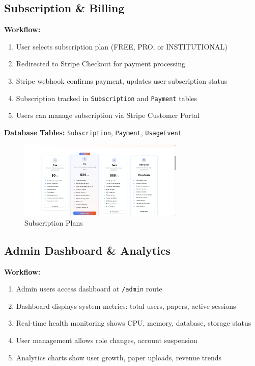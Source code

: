 \subsection{Subscription \& Billing}

\textbf{Workflow:}
\begin{enumerate}[leftmargin=*,topsep=3pt,itemsep=2pt]
    \item User selects subscription plan (FREE, PRO, or INSTITUTIONAL)
    \item Redirected to Stripe Checkout for payment processing
    \item Stripe webhook confirms payment, updates user subscription status
    \item Subscription tracked in \texttt{Subscription} and \texttt{Payment} tables
    \item Users can manage subscription via Stripe Customer Portal
\end{enumerate}

\textbf{Database Tables:} \texttt{Subscription}, \texttt{Payment}, \texttt{UsageEvent}

\begin{figure}[H]
\centering
\includegraphics[width=0.7\textwidth]{images/screenshots/billing_plan.png}
\caption{Subscription Plans}
\label{fig:billing}
\end{figure}

\subsection{Admin Dashboard \& Analytics}

\textbf{Workflow:}
\begin{enumerate}[leftmargin=*,topsep=3pt,itemsep=2pt]
    \item Admin users access dashboard at \texttt{/admin} route
    \item Dashboard displays system metrics: total users, papers, active sessions
    \item Real-time health monitoring shows CPU, memory, database, storage status
    \item User management allows role changes, account suspension
    \item Analytics charts show user growth, paper uploads, revenue trends
\end{enumerate}

